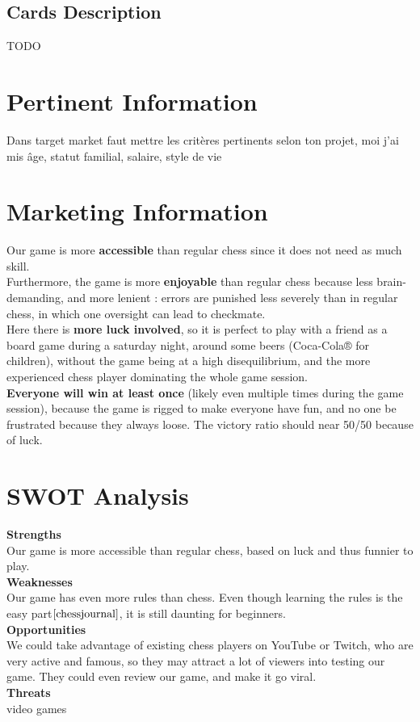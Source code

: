 \documentclass[12pt]{article}
\begin{document}
        \subsection{Cards Description}
            TODO
    
    \section{Pertinent Information}
        
        Dans target market faut mettre les critères pertinents selon ton projet, moi j'ai mis âge, statut familial, salaire, style de vie
    
    \section{Marketing Information}
        Our game is more \textbf{accessible} than regular chess since it does not need as much skill.
        \\Furthermore, the game is more \textbf{enjoyable} than regular chess because less brain-demanding, and more lenient : errors are punished less severely than in regular chess, in which one oversight can lead to checkmate.
        \\Here there is \textbf{more luck involved}, so it is perfect to play with a friend as a board game during a saturday night, around some beers (Coca-Cola® for children), without the game being at a high disequilibrium, and the more experienced chess player dominating the whole game session.
        \\\textbf{Everyone will win at least once} (likely even multiple times during the game session), because the game is rigged to make everyone have fun, and no one be frustrated because they always loose. The victory ratio should near 50/50 because of luck.

    
    \section{SWOT Analysis}
    \textbf{Strengths}
    \\Our game is more accessible than regular chess, based on luck and thus funnier to play.
    \\\textbf{Weaknesses}
    \\Our game has even more rules than chess. Even though learning the rules is the easy part$\cite{chessjournal}$, it is still daunting for beginners.
    \\\textbf{Opportunities}
    \\We could take advantage of existing chess players on YouTube or Twitch, who are very active and famous, so they may attract a lot of viewers into testing our game. They could even review our game, and make it go viral.
    \\\textbf{Threats} 
    \\video games
\end{document}

